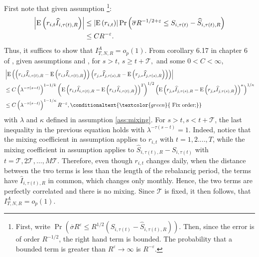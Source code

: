 First note that given assumption \footnote{First, write $\mathrm{\Pr }\left( \overline{\sigma }R^{\varepsilon} \leq R^{1/2} \left( S_{i,\tau(t) }-\widehat{S}_{i,\tau(t),R} \right) \right) $. Then, since the error is of order $R^{-1/2}$, the right hand term is bounded. The probability that a bounded term is greater than $R^\varepsilon \rightarrow \infty$ is $R^{-\varepsilon}$.}:
\begin{align}
\left\vert \mathrm{E}\left( r_{i,t}\widehat{I}_{i,\tau(t),R}\right) \right\vert &\leq \left \vert \mathrm{E}\left( r_{i,t} \right) \right \vert \mathrm{\Pr }\left( \overline{\sigma }R^{-1/2+\varepsilon} \leq S_{i,\tau(t) }-\widehat{S}_{i,\tau(t),R} \right) \\
&\leq C R^{-\varepsilon }. \notag
\end{align}
Thus, it suffices to show that $I^A_{T,N,R}=o_{p}(1)$. From corollary 6.17 in chapter 6 of \cite{white2014asymptotic}, given assumptions  and , for $s > t$, $s\geq t + \mathcal{T} ,$ and some $0<C<\infty $,
\begin{align}
&\left \vert \mathrm{E} \left( \left( r_{i,t}\widehat{I}_{i,\tau(t),R}- \mathrm{E}\left( r_{i,t}\widehat{I}_{i,\tau(t),R}\right) \right) \left( r_{j,s}\widehat{I}_{j,\tau(s),R}-\mathrm{E} \left(r_{j,s}\widehat{I}_{j,\tau(s),R}\right) \right) \right) \right \vert \\ 
&\leq C\left( \lambda ^{-\tau(s-t) }\right)^{1-1/k }\left( \mathrm{E}\left( r_{i,t}\widehat{I}_{i,\tau(t),R}-\mathrm{E}\left( r_{i,t}\widehat{I}_{i,\tau(t),R}\right) \right) ^{2}\right)^{1/2} \left( \mathrm{E}\left( r_{j,s}\widehat{I}_{j,\tau(s),R}-\mathrm{E}\left( r_{j,s}\widehat{I}_{j,\tau(s),R}\right) \right)^{\kappa}\right)^{1/\kappa } \notag \\
&\leq C\left( \lambda ^{-\tau(s-t) }\right)^{1-1/\kappa} R^{-\varepsilon }, \notag \conditionaltext{\textcolor{green}{\ \text{Fix order;}}}
\end{align}
with $\lambda $ and $\kappa$ defined in assumption \ref{ass:mixing}. For $s>t,s<t+\mathcal{T}$, the last inequality in the previous equation holds with $\lambda^{-\tau(s-t) }=1$. Indeed, notice that the mixing coefficient in assumption  applies to $r_{i,t}$ with $t=1,2....,T$, while the mixing coefficient in assumption  applies to $\widehat{S}_{i,\tau(t),R}-S_{i,\tau(t) }$ with $t=\mathcal{T},2 \mathcal{T}, \ldots ,M \mathcal{T}$. Therefore, even though $r_{i,t}$ changes daily, when the distance between the two terms is less than the length of the rebalancig period, the terms have $\widehat{I}_{i,\tau(t),R}$ in common, which changes only monthly. Hence, the two terms are perfectly correlated and there is no mixing. Since $\mathcal{T}$ is fixed, it then follows, that $I^A_{T,N,R}=o_{p}(1)$. \conditionaltext{\textcolor{green}{Explain $o_p(1)$}}

